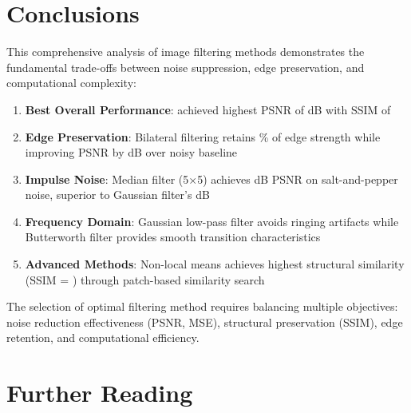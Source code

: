\documentclass[a4paper, 11pt]{article}
\begin{document}
\section{Conclusions}

This comprehensive analysis of image filtering methods demonstrates the fundamental trade-offs between noise suppression, edge preservation, and computational complexity:

\begin{enumerate}
\item \textbf{Best Overall Performance}:  achieved highest PSNR of  dB with SSIM of 

\item \textbf{Edge Preservation}: Bilateral filtering retains \% of edge strength while improving PSNR by  dB over noisy baseline

\item \textbf{Impulse Noise}: Median filter (5×5) achieves  dB PSNR on salt-and-pepper noise, superior to Gaussian filter's  dB

\item \textbf{Frequency Domain}: Gaussian low-pass filter avoids ringing artifacts while Butterworth filter provides smooth transition characteristics

\item \textbf{Advanced Methods}: Non-local means achieves highest structural similarity (SSIM = ) through patch-based similarity search
\end{enumerate}

The selection of optimal filtering method requires balancing multiple objectives: noise reduction effectiveness (PSNR, MSE), structural preservation (SSIM), edge retention, and computational efficiency.

\section*{Further Reading}
\end{document}
